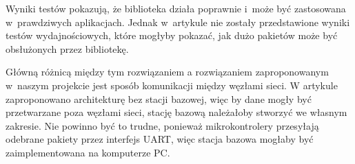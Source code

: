 Wyniki testów pokazują, że biblioteka działa poprawnie i~może być zastosowana w~prawdziwych aplikacjach.
Jednak w~artykule nie zostały przedstawione wyniki testów wydajnościowych, które mogłyby pokazać, jak dużo pakietów może być obsłużonych przez bibliotekę.

Główną różnicą między tym rozwiązaniem a rozwiązaniem zaproponowanym w~naszym projekcie jest sposób komunikacji między węzłami sieci.
W artykule zaproponowano architekturę bez stacji bazowej, więc by dane mogły być przetwarzane poza węzłami sieci, stację bazową należałoby stworzyć we własnym zakresie.
Nie powinno być to trudne, ponieważ mikrokontrolery przesyłają odebrane pakiety przez interfejs UART, więc stacja bazowa mogłaby być zaimplementowana na komputerze PC.
